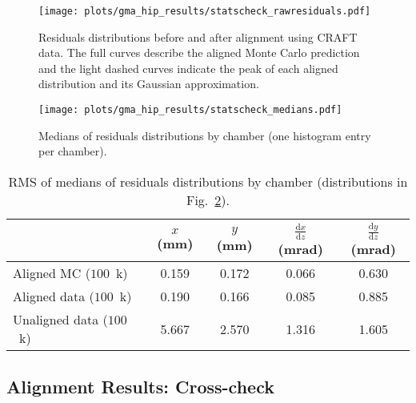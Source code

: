 \documentclass[11pt,twoside,a4paper,cmspaper]{cms-tdr}
\begin{document}
\begin{figure}[p]
\centering
\texttt{[image: plots/gma\_hip\_results/statscheck\_rawresiduals.pdf]}
\caption{Residuals distributions before and after alignment using
CRAFT data.  The full curves describe the aligned Monte
Carlo prediction and the light dashed curves indicate the peak
of each aligned distribution and its Gaussian approximation. \label{fig:residuals_all}}
\end{figure}

\begin{figure}[p]
\centering
\texttt{[image: plots/gma\_hip\_results/statscheck\_medians.pdf]}
\caption{Medians of residuals distributions by chamber (one histogram
entry per chamber). \label{fig:residuals_mean}}
\end{figure}

\begin{table}[p]
\caption{RMS of medians of residuals distributions by chamber (distributions in Fig.~\ref{fig:residuals_mean}).} \label{tab:residuals_mean}

\vspace{-0.5 cm}
\begin{center}
\renewcommand{\arraystretch}{1.5}
\begin{tabular}{l | c c c c}
\hline\hline & \hspace{0.3 cm}$x$ (mm)\hspace{0.3 cm} & \hspace{0.3 cm}$y$ (mm)\hspace{0.3 cm} & \hspace{0.3 cm}$\frac{\textrm{d}x}{\textrm{d}z}$ (mrad)\hspace{0.3 cm} & \hspace{0.3 cm}$\frac{\textrm{d}y}{\textrm{d}z}$ (mrad)\hspace{0.3 cm} \\\hline
Aligned MC ($100$~k) & 0.159 & 0.172 & 0.066 & 0.630 \\
Aligned data ($100$~k) & 0.190 & 0.166 & 0.085 & 0.885 \\\hline
Unaligned data ($100$~k) & 5.667 & 2.570 & 1.316 & 1.605 \\\hline\hline
\end{tabular}
\end{center}
\end{table}

\subsection{Alignment Results: Cross-check}
\label{sec:gmavalidation}
\end{document}
